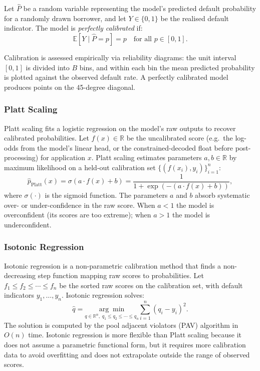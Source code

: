 \begin{context}
\begin{definition}[Calibration]
\label{def:calibration}
Let $\hat{P}$ be a random variable representing the model's predicted default probability for a randomly drawn borrower, and let $Y \in \{0, 1\}$ be the realised default indicator. The model is \emph{perfectly calibrated} if:
\begin{equation}
  \mathbb{E}[Y \mid \hat{P} = p] = p \quad \text{for all } p \in [0, 1].
  \label{eq:calibration}
\end{equation}
\end{definition}

Calibration is assessed empirically via reliability diagrams: the unit interval $[0,1]$ is divided into $B$ bins, and within each bin the mean predicted probability is plotted against the observed default rate. A perfectly calibrated model produces points on the 45-degree diagonal.

\subsubsection*{Platt Scaling}

Platt scaling \cite{platt1999probabilistic} fits a logistic regression on the model's raw outputs to recover calibrated probabilities. Let $f(x) \in \mathbb{R}$ be the uncalibrated score (e.g.\ the log-odds from the model's linear head, or the constrained-decoded float before post-processing) for application $x$. Platt scaling estimates parameters $a, b \in \mathbb{R}$ by maximum likelihood on a held-out calibration set $\{(f(x_i), y_i)\}_{i=1}^n$:
\begin{equation}
  \hat{p}_{\text{Platt}}(x) = \sigma(a \cdot f(x) + b) = \frac{1}{1 + \exp(-(a \cdot f(x) + b))},
  \label{eq:platt}
\end{equation}
where $\sigma(\cdot)$ is the sigmoid function. The parameters $a$ and $b$ absorb systematic over- or under-confidence in the raw score. When $a < 1$ the model is overconfident (its scores are too extreme); when $a > 1$ the model is underconfident.

\subsubsection*{Isotonic Regression}

Isotonic regression \cite{zadrozny2002transforming} is a non-parametric calibration method that finds a non-decreasing step function mapping raw scores to probabilities. Let $f_1 \leq f_2 \leq \cdots \leq f_n$ be the sorted raw scores on the calibration set, with default indicators $y_1, \ldots, y_n$. Isotonic regression solves:
\begin{equation}
  \hat{q} = \underset{q \in \mathbb{R}^n,\; q_1 \leq q_2 \leq \cdots \leq q_n}{\arg\min} \sum_{i=1}^{n} (q_i - y_i)^2.
  \label{eq:isotonic}
\end{equation}
The solution is computed by the pool adjacent violators (PAV) algorithm in $O(n)$ time. Isotonic regression is more flexible than Platt scaling because it does not assume a parametric functional form, but it requires more calibration data to avoid overfitting and does not extrapolate outside the range of observed scores.


\end{context}
